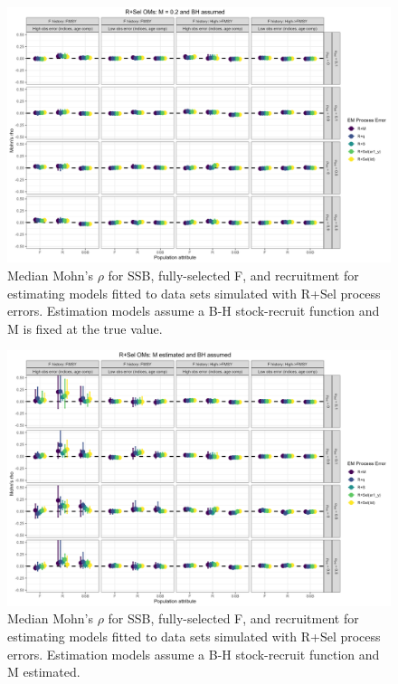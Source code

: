 \documentclass[
  12pt,
]{article}
\begin{document}
\begin{landscape}
\begin{figure}
\caption{Median Mohn's $\rho$ for SSB, fully-selected F, and recruitment for estimating models fitted to data sets simulated with R+Sel process errors.  Estimation models assume a B-H stock-recruit function and M is fixed at the true value.}\label{Sel_om_em_BH_MF_mohns_rho}
\begin{center}
\includegraphics[width = \textwidth]{Sel_om_mohns_rho_BH_MF.png}
\end{center}
\end{figure}
\end{landscape}

\begin{landscape}
\begin{figure}
\caption{Median Mohn's $\rho$ for SSB, fully-selected F, and recruitment for estimating models fitted to data sets simulated with R+Sel process errors.  Estimation models assume a B-H stock-recruit function and M estimated.}\label{Sel_om_em_BH_ME_mohns_rho}
\begin{center}
\includegraphics[width = \textwidth]{Sel_om_mohns_rho_BH_ME.png}
\end{center}
\end{figure}
\end{landscape}
\end{document}
